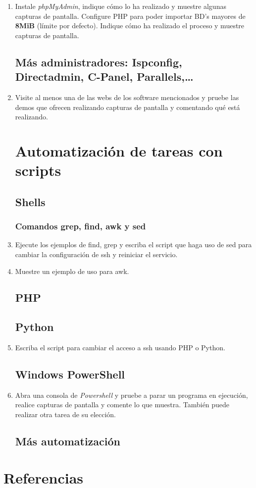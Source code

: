 \documentclass[paper=a4, fontsize=11pt]{scrartcl} %
\numberwithin{equation}{section} %
\numberwithin{figure}{section} %
\numberwithin{table}{section} %
\begin{document}
\begin{enumerate}
	\item Instale \textit{phpMyAdmin}, indique cómo lo ha realizado y muestre algunas capturas de
	pantalla. Configure PHP para poder importar BD's mayores de \textbf{8MiB} (límite por defecto).
	Indique cómo ha realizado el proceso y muestre capturas de pantalla.
	
	\subsection{Más administradores: Ispconfig, Directadmin, C-Panel, Parallels,\dots}
	\item Visite al menos una de las webs de los software mencionados y pruebe las demos que ofrecen
	realizando capturas de pantalla y comentando qué está realizando.
	
	\section{Automatización de tareas con scripts}
	\subsection{Shells}
	\subsubsection*{Comandos grep, find, awk y sed}
	\item Ejecute los ejemplos de find, grep y escriba el script que haga uso de sed para cambiar la
	configuración de ssh y reiniciar el servicio.
	
	\item Muestre un ejemplo de uso para awk.
	
	\subsection{PHP}
	\subsection{Python}
	\item Escriba el script para cambiar el acceso a ssh usando PHP o Python.
	
	\subsection{Windows PowerShell}
	\item Abra una consola de \textit{Powershell} y pruebe a parar un programa en ejecución, realice
	capturas de pantalla y comente lo que muestra. También puede realizar otra tarea de su elección.
	
	\subsection{Más automatización}
	
\end{enumerate}

\newpage
\section{Referencias}

\end{document}
